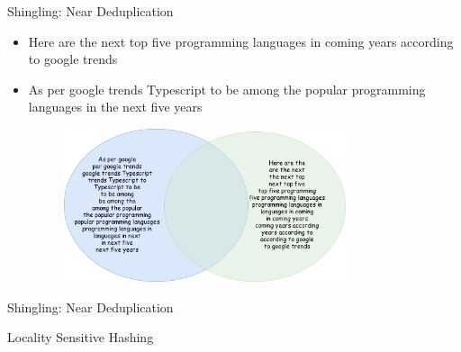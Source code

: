 \documentclass[9pt]{beamer}
\begin{document}

\begin{frame}{Shingling: Near Deduplication}
  \begin{itemize}
  \item Here are the next top five programming languages in coming years according to google trends
  \item As per google trends Typescript to be among the popular programming languages in the next five years
  \end{itemize}
  \pause
  \begin{figure}
    \includegraphics[width=9.5cm,height=4.5cm]{img/shinglesintersect2.png}
  \end{figure}
\end{frame}


\begin{frame}{Shingling: Near Deduplication}
\end{frame}


\begin{frame}{Locality Sensitive Hashing}
  
\end{frame}
\end{document}
